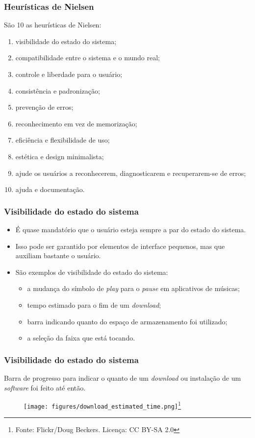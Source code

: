 \documentclass[11pt]{beamer}
\begin{document}
    \begin{frame}
      \frametitle{Heurísticas de Nielsen}
      São 10 as heurísticas de Nielsen:
      \begin{enumerate}
        \item visibilidade do estado do sistema;
        \item compatibilidade entre o sistema e o mundo real;
        \item controle e liberdade para o usuário;
        \item consistência e padronização;
        \item prevenção de erros;
        \item reconhecimento em vez de memorização;
        \item eficiência e flexibilidade de uso;
        \item estética e design minimalista;
        \item ajude os usuários a reconhecerem, diagnosticarem e recuperarem-se de erros;
        \item ajuda e documentação.
      \end{enumerate}
    \end{frame}
    
    \begin{frame}
      \frametitle{Visibilidade do estado do sistema}
      \begin{itemize}
        \item É quase mandatório que o usuário esteja sempre a par do estado do sistema.
        \item Isso pode ser garantido por elementos de interface pequenos, mas que auxiliam bastante o usuário.
        \item São exemplos de visibilidade do estado do sistema:
          \begin{itemize}
            \item a mudança do símbolo de \textit{play} para o \textit{pause} em aplicativos de músicas;
            \item tempo estimado para o fim de um \textit{download};
            \item barra indicando quanto do espaço de armazenamento foi utilizado;
            \item a seleção da faixa que está tocando.
          \end{itemize}
      \end{itemize}
    \end{frame}

    \begin{frame}
      \frametitle{Visibilidade do estado do sistema}
      Barra de progresso para indicar o quanto de um \textit{download} ou instalação de um \textit{software} foi feito até então.
      \begin{figure}[ht]
        \centering
        \texttt{[image: figures/download\_estimated\_time.png]}\footnote{Fonte: Flickr/Doug Beckers. Licença: CC BY-SA 2.0}
      \end{figure}
    \end{frame}
\end{document}
